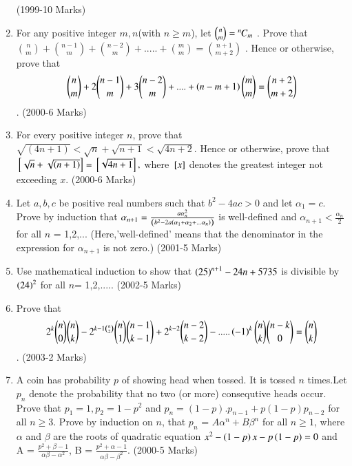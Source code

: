 \documentclass[journal,12pt,onecolumn]{IEEEtran}
\theoremstyle{remark}
\begin{document}
\begin{enumerate}[start=16]
\hfill(1999-10 Marks)
\item
For any positive integer $m,n$(with $n \geq m$), let $\binom{n}{m} ={{}^{n}\mkern-1muC_{m}}$ . Prove that $\binom{n}{m} + \binom{n-1}{m} + \binom{n-2}{m} + ..... + \binom{m}{m} = \binom{n+1}{m+2}$ . Hence or otherwise, prove that 
\begin{align}
\binom{n}{m} +2\binom{n-1}{m} +3\binom{n-2}{m}+....+ \left(n-m+1\right) \binom{m}{m} = \binom{n+2}{m+2}
\end{align}.
\hfill(2000-6 Marks)
\item
For every positive integer $n$, prove that $\sqrt{(4n+1)} < \sqrt{n} +\sqrt{n+1} < \sqrt{4n+2}$. Hence or otherwise, prove that ${}\left[\sqrt{n} + \sqrt{\left(n+1\right)}\right]= {}\left[\sqrt{4n+1}\right],$ where ${}\left[x\right]$ denotes the greatest integer not exceeding $x$.
\hfill(2000-6 Marks)
\item
Let $a,b,c$ be positive real numbers such that $b^2 - 4ac > 0$ and let $\alpha_1 = c$. Prove by induction that $\alpha_{n+1} = \frac{a\alpha_{n}^2}{\left(b^2 - 2a \left(\alpha_1 + \alpha_2 + ... \alpha_n\right)\right)}$ is well-defined and $\alpha_{n+1} < \frac{\alpha_n}{2}$ for all $n$ = 1,2,...
(Here,'well-defined' means that the denominator in the expression for $\alpha_{n+1}$ is not zero.)
\hfill(2001-5 Marks)
\item
Use mathematical induction to show that $\left(25\right)^{n+1} - 24 n + 5735$ is divisible by $\left(24\right)^2$ for all $n$= 1,2,.....
\hfill(2002-5 Marks)
\item 
Prove that
\begin{align}
2^k \binom{n}{0}\binom{n}{k} - 2^{k-1\binom{n}{2}} \binom{n}{1} \binom{n-1}{k-1} + 2^{k-2}\binom{n-2}{k-2} - .....\left(-1\right)^k \binom{n}{k}\binom{n-k}{0} = \binom{n}{k}
\end{align}.
\hfill(2003-2 Marks)
\item
A coin has probability $p$ of showing head when tossed. It is tossed $n$ times.Let $p_n$ denote the probability that no two (or more) consequtive heads occur. Prove that $p_1=1 , p_2=1-p^2$ and $p_n = (1-p).p_{n-1} + p(1-p)p_{n-2}$ for all $ n \geq 3 $. Prove by induction on $n$, that $p_n$ = $A\alpha^n + B\beta^n$ for all $n \geq 1$, where $\alpha$ and $\beta$ are the roots of quadratic equation $x^2 - \left(1-p\right)x - p\left(1-p\right) = 0$ and A = $\frac{p^2 + \beta -1}{\alpha\beta-\alpha^2}$, B = $\frac{p^2 + \alpha -1}{\alpha\beta - \beta^2}$.
\hfill(2000-5 Marks)



\end{enumerate}
\end{document}
